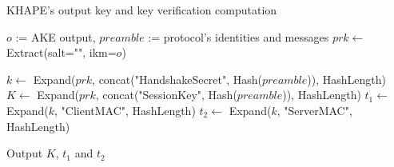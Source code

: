 \documentclass[../report.tex]{subfiles}
\begin{document}
\begin{algorithm}
\caption{KHAPE's output key and key verification computation}
\label{alg:key_derivation_2}
\begin{algorithmic}
\Require $o$ := AKE output, $preamble$ := protocol's identities and messages
\State $prk \gets$ Extract(salt="", ikm=$o$)


\State $k \gets$ Expand($prk$, concat("HandshakeSecret", Hash($preamble$)), HashLength)
\State $K \gets$ Expand($prk$, concat("SessionKey", Hash($preamble$)), HashLength)
\State $t_1 \gets$ Expand($k$, "ClientMAC", HashLength)
\State $t_2 \gets$ Expand($k$, "ServerMAC", HashLength)

\State Output $K$, $t_1$ and $t_2$
\end{algorithmic}
\end{algorithm}

% 
% 
% 



% 
% 
% 
% 
% 
% 
% 
% 
\end{document}
